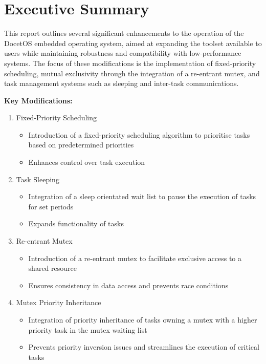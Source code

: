 \section{Executive Summary}
This report outlines several significant enhancements to the operation of the DocetOS embedded operating system, aimed at expanding the toolset available to users while maintaining robustness and compatibility with low-performance systems. The focus of these modifications is the implementation of fixed-priority scheduling, mutual exclusivity through the integration of a re-entrant mutex, and task management systems such as sleeping and inter-task communications.\hfill\break

\noindent\textbf{Key Modifications:}
\begin{enumerate}
	\item Fixed-Priority Scheduling
	\begin{itemize}
		\item Introduction of a fixed-priority scheduling algorithm to prioritise tasks based on predetermined priorities
		\item Enhances control over task execution
	\end{itemize}
	
	\item Task Sleeping
	\begin{itemize}
		\item Integration of a sleep orientated wait list to pause the execution of tasks for set periods
		\item Expands functionality of tasks
	\end{itemize}
	
	\item Re-entrant Mutex
	\begin{itemize}
		\item Introduction of a re-entrant mutex to facilitate exclusive access to a shared resource
		\item Ensures consistency in data access and prevents race conditions
	\end{itemize}
	
	\item Mutex Priority Inheritance
	\begin{itemize}
		\item Integration of priority inheritance of tasks owning a mutex with a higher priority task in the mutex waiting list
		\item Prevents priority inversion issues and streamlines the execution of critical tasks
	\end{itemize}
	

\end{enumerate}
